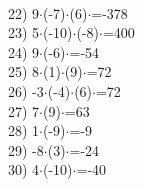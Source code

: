 \documentclass[a4paper,10pt]{article}
\begin{document}
\vspace{0.5cm}\\22)   9$\cdot$(-7)$\cdot$(6)$\cdot$=-378
\vspace{0.5cm}\\23)   5$\cdot$(-10)$\cdot$(-8)$\cdot$=400
\vspace{0.5cm}\\24)   9$\cdot$(-6)$\cdot$=-54
\vspace{0.5cm}\\25)   8$\cdot$(1)$\cdot$(9)$\cdot$=72
\vspace{0.5cm}\\26)   -3$\cdot$(-4)$\cdot$(6)$\cdot$=72
\vspace{0.5cm}\\27)   7$\cdot$(9)$\cdot$=63
\vspace{0.5cm}\\28)   1$\cdot$(-9)$\cdot$=-9
\vspace{0.5cm}\\29)   -8$\cdot$(3)$\cdot$=-24
\vspace{0.5cm}\\30)   4$\cdot$(-10)$\cdot$=-40
\vspace{0.5cm}\\\pagebreak
\end{document}
